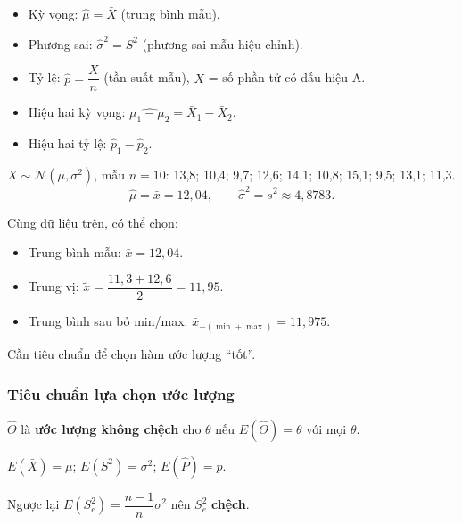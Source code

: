 \documentclass[12pt,a4paper]{article}
\begin{document}
\begin{congthuc}[title={Các ước lượng điểm thông dụng}]
  \begin{itemize}
    \item Kỳ vọng: $\hat{\mu} = \bar{X}$ (trung bình mẫu).
    \item Phương sai: $\hat{\sigma}^2 = S^2$ (phương sai mẫu hiệu chỉnh).
    \item Tỷ lệ: $\hat{p} = \dfrac{X}{n}$ (tần suất mẫu), $X$ = số phần tử có dấu hiệu A.
    \item Hiệu hai kỳ vọng: $\widehat{\mu_1-\mu_2} = \bar{X}_1 - \bar{X}_2$.
    \item Hiệu hai tỷ lệ: $\hat{p}_1 - \hat{p}_2$.
  \end{itemize}
\end{congthuc}

\begin{vidu}[title={Ước lượng $\mu$ và $\sigma^2$}]
$X \sim \mathcal{N}(\mu, \sigma^2)$, mẫu $n=10$: 13{,}8; 10{,}4; 9{,}7; 12{,}6; 14{,}1; 10{,}8; 15{,}1; 9{,}5; 13{,}1; 11{,}3.
\[
  \hat{\mu} = \bar{x} = 12{,}04, \qquad \hat{\sigma}^2 = s^2 \approx 4{,}8783.
\]
\end{vidu}

\begin{vidu}[title={Nhiều cách ước lượng $\mu$}]
Cùng dữ liệu trên, có thể chọn:
\begin{itemize}
  \item Trung bình mẫu: $\bar{x} = 12{,}04$.
  \item Trung vị: $\tilde{x} = \dfrac{11{,}3 + 12{,}6}{2} = 11{,}95$.
  \item Trung bình sau bỏ min/max: $\bar{x}_{-(\min+\max)} = 11{,}975$.
\end{itemize}
Cần tiêu chuẩn để chọn hàm ước lượng ``tốt''.
\end{vidu}

\subsubsection{Tiêu chuẩn lựa chọn ước lượng}

\begin{dinhnghia}[title={Ước lượng không chệch}]
  $\hat{\Theta}$ là \textbf{ước lượng không chệch} cho $\theta$ nếu $E(\hat{\Theta}) = \theta$ với mọi $\theta$.
\end{dinhnghia}

\begin{tinhchat}[title={Không chệch của $\bar{X}$, $S^2$, $\hat{P}$}]
  $E(\bar{X}) = \mu$; $E(S^2) = \sigma^2$; $E(\hat{P}) = p$.
  
  Ngược lại $E(S_e^2) = \dfrac{n-1}{n}\sigma^2$ nên $S_e^2$ \textbf{chệch}.
\end{tinhchat}
\end{document}
